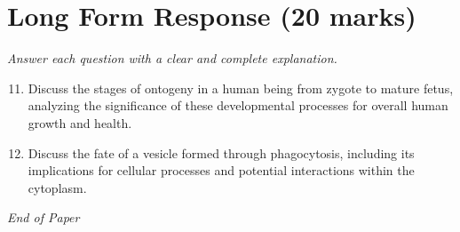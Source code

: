 \documentclass[12pt]{article}
\begin{document}
\section*{Long Form Response (20 marks)}
\textit{Answer each question with a clear and complete explanation.}
\begin{enumerate}[label=\arabic*.]
\setcounter{enumi}{10}
\item Discuss the stages of ontogeny in a human being from zygote to mature fetus, analyzing the significance of these developmental processes for overall human growth and health.
\item Discuss the fate of a vesicle formed through phagocytosis, including its implications for cellular processes and potential interactions within the cytoplasm.
\end{enumerate}

\vfill
\noindent\textit{End of Paper}
\end{document}
